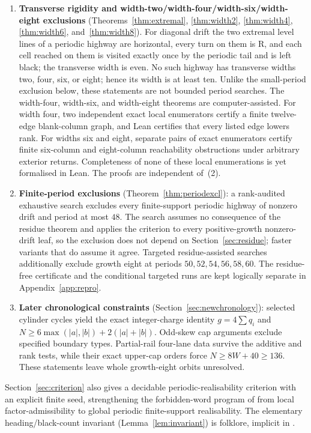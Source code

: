 \documentclass[11pt,letterpaper]{article}
\theoremstyle{plain}
\theoremstyle{definition}
\newcommand{\growth}{g}
\newcommand{\turnR}{\mathrm{R}}
\begin{document}
\begin{NoHyper}
\begin{enumerate}[leftmargin=2.4em,label=\textbf{(\arabic*)}]
\item \textbf{Transverse rigidity and width-two/width-four/width-six/width-eight exclusions}
(Theorems~\ref{thm:extremal}, \ref{thm:width2}, \ref{thm:width4},
\ref{thm:width6}, and~\ref{thm:width8}). For diagonal drift the two
extremal level lines of a periodic highway are horizontal, every turn on them is
$\turnR$, and each cell reached on them is visited exactly once by the periodic tail
and is left black; the transverse width is even. No such highway has
transverse widths two, four, six, or eight; hence its width is at least ten. Unlike the
small-period exclusion below,
these statements are not bounded period searches.  The width-four, width-six, and
width-eight theorems are computer-assisted.  For width four, two independent exact local
enumerators certify a finite
twelve-edge blank-column graph, and Lean certifies that every listed edge lowers
rank.  For widths six and eight, separate pairs of exact enumerators certify finite
six-column and eight-column reachability obstructions under arbitrary exterior
returns.  Completeness of none of these local enumerations is yet formalised in Lean.  The
proofs are independent of~(2).

\item \textbf{Finite-period exclusions} (Theorem~\ref{thm:periodexcl}): a rank-audited
exhaustive search excludes every finite-support periodic highway of nonzero drift and
period at most $48$. The search assumes no consequence of the residue theorem and
applies the criterion to every positive-growth nonzero-drift leaf, so the exclusion
does not depend on Section~\ref{sec:residue}; faster variants that do assume it agree.
Targeted residue-assisted searches additionally exclude growth eight at periods
$50,52,54,56,58,60$.  The residue-free certificate and the conditional targeted
runs are kept logically separate in Appendix~\ref{app:repro}.
\item \textbf{Later chronological constraints}
(Section~\ref{sec:newchronology}): selected cylinder cycles yield the exact
integer-charge identity $\growth=4\sum q_i$ and
$N\ge6\max(|a|,|b|)+2(|a|+|b|)$. Odd-skew cap arguments exclude specified
boundary types. Partial-rail four-lane data survive the additive and rank
tests, while their exact upper-cap orders force $N\ge8W+40\ge136$.
These statements leave whole growth-eight orbits unresolved.
\end{enumerate}

Section~\ref{sec:criterion} also gives a decidable periodic-realisability criterion
with an explicit finite seed, strengthening the forbidden-word program of
\cite{Gajardo2003symbolic} from local factor-admissibility to global periodic
finite-support realisability. The
elementary heading/black-count invariant (Lemma~\ref{lem:invariant}) is folklore,
implicit in \cite{BunimovichTroubetzkoy1992,GaleProppSutnerTroubetzkoy1995}.


\end{NoHyper}
\end{document}

